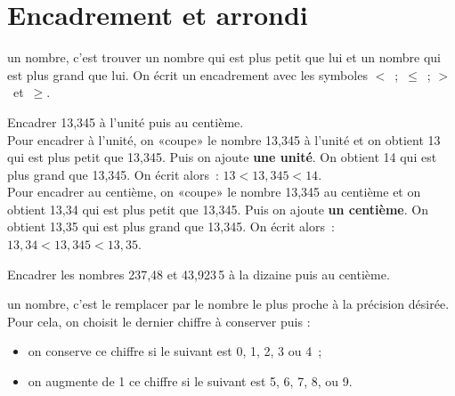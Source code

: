 
\section{Encadrement et arrondi}

\begin{aconnaitre}
\textbf{} un nombre, c'est trouver un nombre qui est plus petit que lui et un nombre qui est plus grand que lui. On écrit un encadrement avec les symboles $<$ ; $\leqslant$ ; $>$ et $\geqslant$. 
\end{aconnaitre}


\begin{methode*1}[Encadrer]

\begin{exemple*1}
Encadrer 13,345 à l'unité puis au centième.\\[0.5em]
Pour encadrer à l'unité, on «coupe» le nombre 13,345 à l'unité et on obtient 13 qui est plus petit  que 13,345. Puis on ajoute \textbf{une unité}. On obtient 14 qui est plus grand que 13,345. On écrit alors : $13 < 13,345 < 14$. \\[1em]
Pour encadrer au centième, on «coupe» le nombre 13,345 au centième et on obtient 13,34 qui est plus petit que 13,345. Puis on ajoute \textbf{un centième}. On obtient 13,35 qui est plus grand que 13,345. On écrit alors : $13,34 < 13,345 < 13,35$.
\end{exemple*1}

\exercice

Encadrer les nombres 237,48 et 43,923\,5 à la dizaine puis au centième.

\end{methode*1}



\begin{aconnaitre}
\textbf{} un nombre, c’est le remplacer par le nombre le plus proche à la précision désirée. Pour cela, on choisit le dernier chiffre à conserver puis :
\begin{itemize}
 \item on conserve ce chiffre si le suivant est 0, 1, 2, 3 ou 4 ;
 \item on augmente de 1 ce chiffre si le suivant est 5, 6, 7, 8, ou 9.
 \end{itemize}
\end{aconnaitre}



